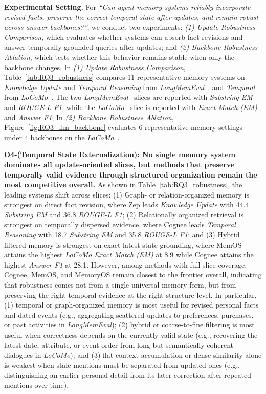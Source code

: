 \noindent \textbf{Experimental Setting.}
For \textit{``Can agent memory systems reliably incorporate revised facts, preserve the correct temporal state after updates, and remain robust across answer backbones?''}, we conduct two experiments: \textit{(1) Update Robustness Comparison}, which evaluates whether systems can absorb fact revisions and answer temporally grounded queries after updates; and \textit{(2) Backbone Robustness Ablation}, which tests whether this behavior remains stable when only the \llm backbone changes.
In \textit{(1) Update Robustness Comparison}, Table~\ref{tab:RQ3_robustness} compares 11 representative memory systems on \textit{Knowledge Update} and \textit{Temporal Reasoning} from \textit{LongMemEval}~\cite{wu2024longmemeval}, and \textit{Temporal} from \textit{LoCoMo}~\cite{maharana2024locomo}.
The two \textit{LongMemEval}~\cite{wu2024longmemeval} slices are reported with \textit{Substring EM} and \textit{ROUGE-L F1}, while the \textit{LoCoMo}~\cite{maharana2024locomo} slice is reported with \textit{Exact Match (EM)} and \textit{Answer F1};
In \textit{(2) Backbone Robustness Ablation}, Figure~\ref{fig:RQ3_llm_backbone} evaluates 6 representative memory settings under 4 \llm backbones on the \textit{LoCoMo}~\cite{maharana2024locomo}.

\noindent \textbf{O4-(Temporal State Externalization): No single memory system dominates all update-oriented slices, but methods that preserve temporally valid evidence through structured organization remain the most competitive overall.}
As shown in Table~\ref{tab:RQ3_robustness}, the leading systems shift across slices:
(1) Graph- or relation-organized memory is strongest on direct fact revision, where Zep leads \textit{Knowledge Update} with 44.4 \textit{Substring EM} and 36.8 \textit{ROUGE-L F1};
(2) Relationally organized retrieval is strongest on temporally dispersed evidence, where Cognee leads \textit{Temporal Reasoning} with 18.7 \textit{Substring EM} and 35.8 \textit{ROUGE-L F1};
and (3) Hybrid filtered memory is strongest on exact latest-state grounding, where MemOS attains the highest \textit{LoCoMo} \textit{Exact Match (EM)} at 8.9 while Cognee attains the highest \textit{Answer F1} at 28.1.
However, among methods with full slice coverage, Cognee, MemOS, and MemoryOS remain closest to the frontier overall, indicating that robustness comes not from a single universal memory form, but from preserving the right temporal evidence at the right structure level.
In particular, (1) temporal or graph-organized memory is most useful for revised personal facts and dated events (e.g., aggregating scattered updates to preferences, purchases, or past activities in \textit{LongMemEval}); (2) hybrid or coarse-to-fine filtering is most useful when correctness depends on the currently valid state (e.g., recovering the latest date, attribute, or event order from long but semantically coherent dialogues in \textit{LoCoMo}); and (3) flat context accumulation or dense similarity alone is weakest when stale mentions must be separated from updated ones (e.g., distinguishing an earlier personal detail from its later correction after repeated mentions over time).

